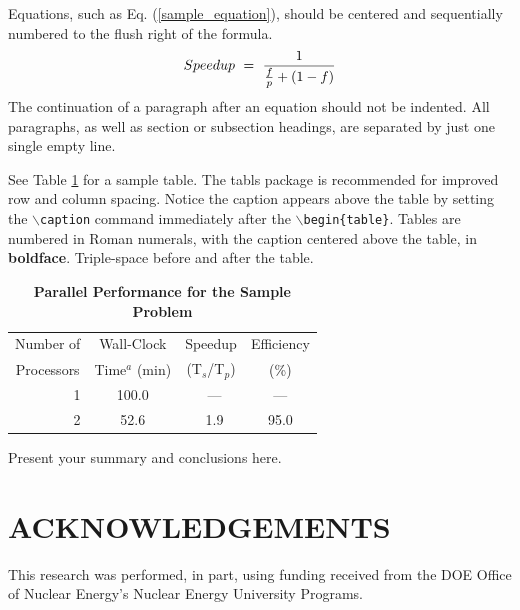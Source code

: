 \documentclass{mc2013}
\begin{document}
Equations, such as Eq. (\ref{sample_equation}), should be centered and 
sequentially numbered to the flush right of the formula.
\begin{equation}
\label{sample_equation}
Speedup\ =\ {1 \over{{f \over {p}} + (1-f)}}
\end{equation}
The continuation of a paragraph after an equation should not be indented.  
All paragraphs, as well as section or subsection headings, are separated by 
just one single empty line.



See Table \ref{table:example} for a sample table.  The tabls package is
recommended for improved row and column spacing.  Notice the caption appears 
above the table by setting the \texttt{$\backslash$caption} command immediately 
after the \texttt{$\backslash$begin\{table\}}. Tables are numbered in Roman 
numerals, with the caption centered above the table, in {\bf boldface}.  
Triple-space before and after the table.

\vspace{16pt}
\begin{table}[!htb]
\centering
\caption{\bf Parallel Performance for the Sample Problem}
\label{table:example} 
\vspace{14pt}
\begin{tabular}{||r||c|c|c||} \hline \hline
 \multicolumn{1}{||c||}{Number of} &
 \multicolumn{1}{c|}{Wall-Clock} &
 \multicolumn{1}{c|}{Speedup} &
 \multicolumn{1}{c||}{Efficiency} \\
 \multicolumn{1}{||c||}{Processors} &
 \multicolumn{1}{c|}{Time$^{a}$ (min)} &
 \multicolumn{1}{c|}{(T$_{s}$/T$_{p}$)} &
 \multicolumn{1}{c||}{(\%)} \\ \hline\hline
\ 1 &  100.0 & \ ---    & ---  \\ \hline
\ 2 &   52.6 & \ 1.9    & 95.0 \\ \hline \hline
\end{tabular}
\end{table}
\vspace{16pt}



Present your summary and conclusions here.


\section*{ACKNOWLEDGEMENTS}

This research was performed, in part, using funding received from the DOE Office of Nuclear
Energy's Nuclear Energy University Programs.
\end{document}
